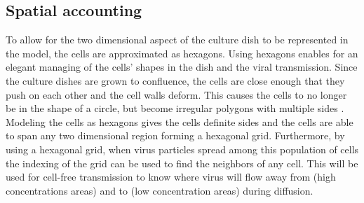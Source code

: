 

\subsection{Spatial accounting} \label{Spatial_accounting}

To allow for the two dimensional aspect of the culture dish to be represented in the model, the cells are approximated as hexagons. Using hexagons enables for an elegant managing of the cells' shapes in the dish and the viral transmission. Since the culture dishes are grown to confluence, the cells are close enough that they push on each other and the cell walls deform. This causes the cells to no longer be in the shape of a circle, but become irregular polygons with multiple sides \citep{bruckner_importance_2018}. Modeling the cells as hexagons gives the cells definite sides and the cells are able to span any two dimensional region forming a hexagonal grid. Furthermore, by using a hexagonal grid, when virus particles spread among this population of cells the indexing of the grid can be used to find the neighbors of any cell. This will be used for cell-free transmission to know where virus will flow away from (high concentrations areas) and to (low concentration areas) during diffusion. 

